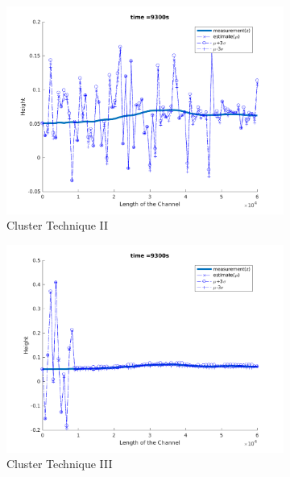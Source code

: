 \begin{figure}[H]
\begin{subfigure}[b]{0.3\textwidth}
\includegraphics[width=\textwidth]{figures_2/fig231}
\caption{Cluster Technique II}
\end{subfigure}   
\begin{subfigure}[b]{0.3\textwidth}
\centering
\includegraphics[width=\textwidth]{figures_2/fig331}
\caption{Cluster Technique III}
\end{subfigure} \\
\begin{subfigure}[b]{0.3\textwidth}
\centering

\end{subfigure}
\end{figure}
